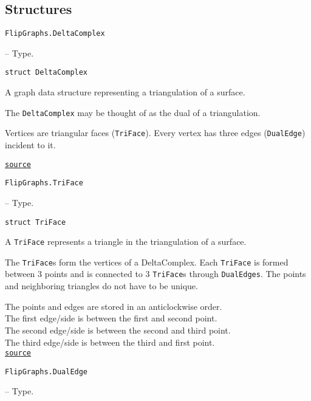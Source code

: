 \subsection{Structures}



\label{15035490444877811912}{}

\hypertarget{1315454663023603173}{\texttt{FlipGraphs.DeltaComplex}}  -- {Type.}

\begin{adjustwidth}{2em}{0pt}


\begin{verbatim}
struct DeltaComplex
\end{verbatim}

A graph data structure representing a triangulation of a surface.

The \texttt{DeltaComplex} may be thought of as the dual of a triangulation.

Vertices are triangular faces (\texttt{TriFace}). Every vertex has three edges (\texttt{DualEdge}) incident to it.



\href{https://github.com/schto223/FlipGraphs.jl/blob/e35d43698a06b86273148826b79d585ba04fcd26/src/deltaComplex.jl#L47-L55}{\texttt{source}}


\end{adjustwidth}
\hypertarget{724782505096909684}{\texttt{FlipGraphs.TriFace}}  -- {Type.}

\begin{adjustwidth}{2em}{0pt}


\begin{verbatim}
struct TriFace
\end{verbatim}

A \texttt{TriFace} represents a triangle in the triangulation of a surface. 

The \texttt{TriFace}s form the vertices of a DeltaComplex. Each \texttt{TriFace} is formed between 3 points and is connected to 3 \texttt{TriFace}s through \texttt{DualEdges}. The points and neighboring triangles do not have to be unique.

The points and edges are stored in an anticlockwise order.\\
The first edge/side is between the first and second point.\\
The second edge/side is between the second and third point.\\
The third edge/side is between the third and first point.\\




\href{https://github.com/schto223/FlipGraphs.jl/blob/e35d43698a06b86273148826b79d585ba04fcd26/src/deltaComplex.jl#L24-L37}{\texttt{source}}


\end{adjustwidth}
\hypertarget{10259513458807449042}{\texttt{FlipGraphs.DualEdge}}  -- {Type.}

